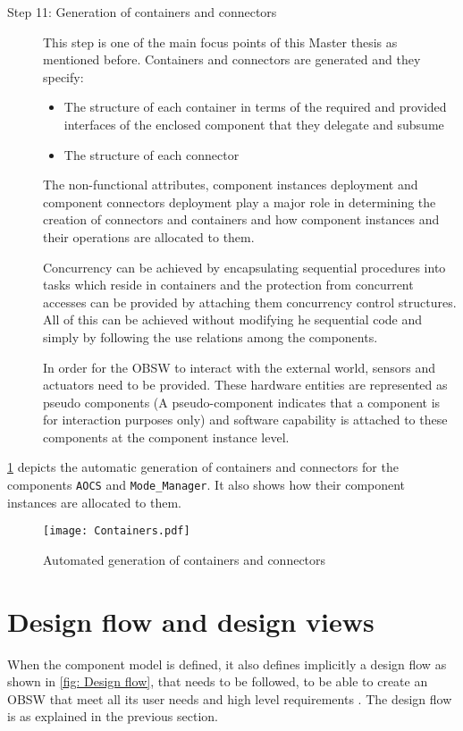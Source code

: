 \begin{description}
\item [Step 11: Generation of containers and connectors]  This step is one of the main focus points of this Master thesis as mentioned before. Containers and connectors are generated and they specify:
\begin{itemize}
\item The structure of each container in terms of the required and provided interfaces of the enclosed component that they delegate and subsume
\item The structure of each connector 
\end{itemize} 
The non-functional attributes, component instances deployment and component connectors deployment play a major role in determining the creation of connectors and containers and how component instances and their operations are allocated to them.

Concurrency can be achieved by encapsulating sequential procedures into tasks which reside in containers and the protection from concurrent accesses can be provided by attaching them concurrency control structures. All of this can be achieved without modifying he sequential code and simply by following the use relations among the components.

In order for the OBSW to interact with the external world, sensors and actuators need to be provided. These hardware entities are represented as pseudo components (A pseudo-component indicates that a component is for interaction purposes only) and software capability is attached to these components at the component instance level.    
\end{description}

\cref{fig: Containers} depicts the automatic generation of containers and connectors for the components \texttt{AOCS} and \texttt{Mode\_Manager}. It also shows how their component instances are allocated to them. 

\begin{figure}[h]
	\centering
	\texttt{[image: Containers.pdf]}
	\caption{Automated generation of containers and connectors}
	\label{fig: Containers}
\end{figure}

\section{Design flow and design views}
\label{section: Design flow and views}
When the component model is defined, it also defines implicitly a design flow as shown in \cref{fig: Design flow}, that needs to be followed, to be able to create an OBSW that meet all its user needs and high level requirements \cite{SAVOIR}\cite{PhdThesis}\cite{CompBasedProcess}. The design flow is as explained in the previous section. 

